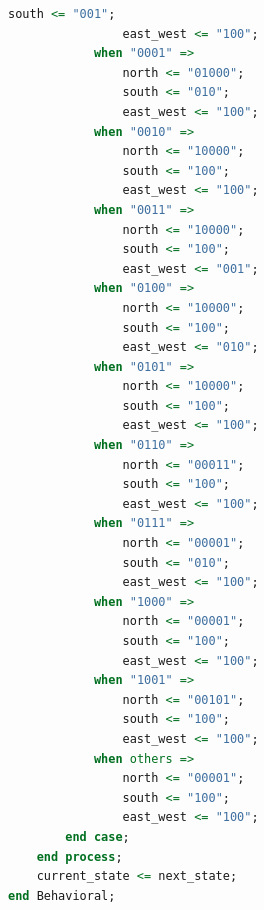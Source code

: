 \documentclass[11pt]{article}
\begin{document}
\begin{appendices}
\begin{lstlisting}[language=VHDL]
                south <= "001";
                east_west <= "100";
            when "0001" =>
                north <= "01000";
                south <= "010";
                east_west <= "100";
            when "0010" =>
                north <= "10000";
                south <= "100";
                east_west <= "100";
            when "0011" =>
                north <= "10000";
                south <= "100";
                east_west <= "001";
            when "0100" =>
                north <= "10000";
                south <= "100";
                east_west <= "010";
            when "0101" =>
                north <= "10000";
                south <= "100";
                east_west <= "100";
            when "0110" =>
                north <= "00011";
                south <= "100";
                east_west <= "100";
            when "0111" =>
                north <= "00001";
                south <= "010";
                east_west <= "100";
            when "1000" =>
                north <= "00001";
                south <= "100";
                east_west <= "100";
            when "1001" =>
                north <= "00101";
                south <= "100";
                east_west <= "100";
            when others =>
                north <= "00001";
                south <= "100";
                east_west <= "100";
        end case;
    end process;
    current_state <= next_state;
end Behavioral;
\end{lstlisting}


\end{appendices}
\end{document}
